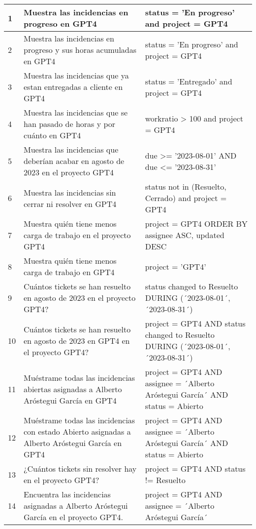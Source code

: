 \begin{center}
\begin{longtable}{ | p{1cm} | p{8cm} | p{6cm} | }
        1 & Muestra las incidencias en progreso en GPT4 & status = 'En progreso' and project = GPT4 \\
        \hline
        2 & Muestra las incidencias en progreso y sus horas acumuladas en GPT4 & status = 'En progreso' and project = GPT4 \\
        \hline
        3 & Muestra las incidencias que ya estan entregadas a cliente en GPT4 & status = 'Entregado' and project = GPT4 \\
        \hline
        4 & Muestra las incidencias que se han pasado de horas y por cuánto en GPT4 & workratio > 100 and project = GPT4 \\
        \hline
        5 & Muestra las incidencias que deberían acabar en agosto de 2023 en el proyecto GPT4 & due >= '2023-08-01' AND due <= '2023-08-31' \\
        \hline
        6 & Muestra las incidencias sin cerrar ni resolver en GPT4 & status not in (Resuelto, Cerrado) and project = GPT4 \\
        \hline
        7 & Muestra quién tiene menos carga de trabajo en el proyecto GPT4 & project = GPT4 ORDER BY assignee ASC, updated DESC \\
        \hline
        8 & Muestra quién tiene menos carga de trabajo en GPT4 & project = 'GPT4' \\
        \hline
        9 & Cuántos tickets se han resuelto en agosto de 2023 en el proyecto GPT4? & status changed to Resuelto DURING (´2023-08-01´, ´2023-08-31´) \\
        \hline
        10 & Cuántos tickets se han resuelto en agosto de 2023 en GPT4 en el proyecto GPT4? & project = GPT4 AND status changed to Resuelto DURING (´2023-08-01´, ´2023-08-31´) \\
        \hline
        11 & Muéstrame todas las incidencias abiertas asignadas a Alberto Aróstegui García en GPT4 & project = GPT4 AND assignee = ´Alberto Aróstegui García´ AND status = Abierto \\
        \hline
        12 & Muéstrame todas las incidencias con estado Abierto asignadas a Alberto Aróstegui García en GPT4 & project = GPT4 AND assignee = ´Alberto Aróstegui García´ AND status = Abierto \\
        \hline
        13 & ¿Cuántos tickets sin resolver hay en el proyecto GPT4? & project = GPT4 AND status != Resuelto \\
        \hline
        14 & Encuentra las incidencias asignadas a Alberto Aróstegui García en el proyecto GPT4. & project = GPT4 AND assignee = ´Alberto Aróstegui García´ \\

\end{longtable}
\end{center}
